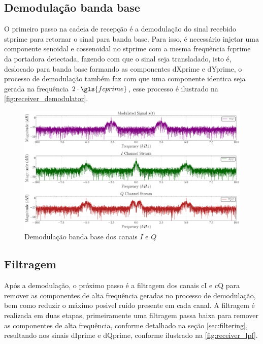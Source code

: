 \subsection{Demodulação banda base}\label{sec:demodulacao}

O primeiro passo na cadeia de recepção é a demodulação do sinal recebido \gls{stprime} para retornar o sinal para banda base. Para isso, é necessário injetar uma componente senoidal e cossenoidal no \gls{stprime} com a mesma frequência \gls{fcprime} da portadora detectada, fazendo com que o sinal seja transladado, isto é, deslocado para banda base formando as componentes \gls{dXprime} e \gls{dYprime}, o processo de demodulação também faz com que uma componente identica seja gerada na frequência $2 \cdot \gls{fcprime}$, esse processo é ilustrado na \autoref{fig:receiver_demodulator}.

\begin{figure}[H]
	\centering
	\caption{Demodulação banda base dos canais $I$ e $Q$}\label{fig:receiver_demodulator}
	\includegraphics[width=\linewidth]{assets/cap3/receiver_demodulator_freq.pdf}
\end{figure}

\subsection{Filtragem}\label{sec:filtragem}

Após a demodulação, o próximo passo é a filtragem dos canais \gls{cI} e \gls{cQ} para remover as componentes de alta frequência geradas no processo de demodulação, bem como reduzir o máximo posivel ruído presente em cada canal. A filtragem é realizada em duas etapas, primeiramente uma filtragem passa baixa para remover as componentes de alta frequência, conforme detalhado na seção \ref{sec:filtering}, resultando nos sinais \gls{dIprime} e \gls{dQprime}, conforme ilustrado na \autoref{fig:receiver_lpf}.

